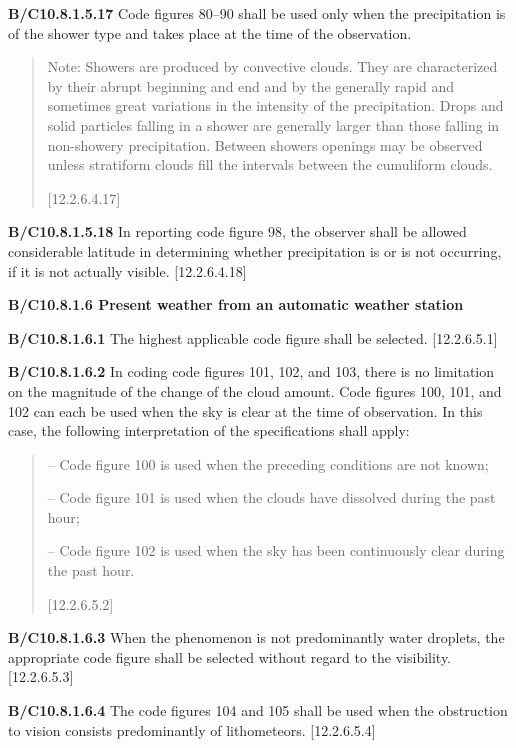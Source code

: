 \textbf{B/C10.8.1.5.17} Code figures 80--90 shall be used only when the precipitation is of the shower type and takes place at the time of the observation.

\begin{quote}
Note: Showers are produced by convective clouds. They are characterized by their abrupt beginning and end and by the generally rapid and sometimes great variations in the intensity of the precipitation. Drops and solid particles falling in a shower are generally larger than those falling in non-showery precipitation. Between showers openings may be observed unless stratiform clouds fill the intervals between the cumuliform clouds.

{[}12.2.6.4.17{]}
\end{quote}

\textbf{B/C10.8.1.5.18} In reporting code figure 98, the observer shall be allowed considerable latitude in determining whether precipitation is or is not occurring, if it is not actually visible. {[}12.2.6.4.18{]}

\textbf{B/C10.8.1.6 Present weather from an automatic weather station}

\textbf{B/C10.8.1.6.1} The highest applicable code figure shall be selected. {[}12.2.6.5.1{]}

\textbf{B/C10.8.1.6.2} In coding code figures 101, 102, and 103, there is no limitation on the magnitude of the change of the cloud amount. Code figures 100, 101, and 102 can each be used when the sky is clear at the time of observation. In this case, the following interpretation of the specifications shall apply:

\begin{quote}
-- Code figure 100 is used when the preceding conditions are not known;

-- Code figure 101 is used when the clouds have dissolved during the past hour;

-- Code figure 102 is used when the sky has been continuously clear during the past hour.

{[}12.2.6.5.2{]}
\end{quote}

\textbf{B/C10.8.1.6.3} When the phenomenon is not predominantly water droplets, the appropriate code figure shall be selected without regard to the visibility. {[}12.2.6.5.3{]}

\textbf{B/C10.8.1.6.4} The code figures 104 and 105 shall be used when the obstruction to vision consists predominantly of lithometeors. {[}12.2.6.5.4{]}

